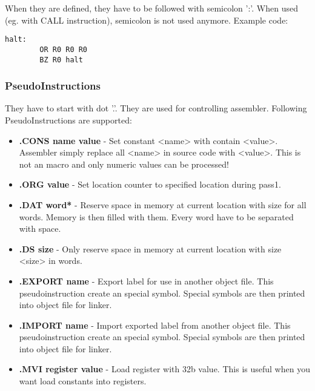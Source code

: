 When they are defined, they have to be followed with semicolon ':'. When used
(eg. with CALL instruction), semicolon is not used anymore. Example code:

\begin{lstlisting}[language={[x86masm]Assembler}, frame=single]
    halt:
        OR R0 R0 R0
        BZ R0 halt
\end{lstlisting}

\subsubsection{PseudoInstructions}

They have to start with dot '.'. They are used for controlling assembler. Following
PseudoInstructions are supported:

\begin{itemize}
    \item \textbf{.CONS name value} -
    Set constant <name> with contain <value>. Assembler simply replace all
    <name> in source code with <value>. This is not an macro and only numeric
    values can be processed!

    \item \textbf{.ORG value} -
    Set location counter to specified location during pass1.

    \item \textbf{.DAT word*} -
    Reserve space in memory at current location with size for all words.
    Memory is then filled with them. Every word have to be separated with
    space.

    \item \textbf{.DS size} -
    Only reserve space in memory at current location with size <size> in words.

    \item \textbf{.EXPORT name} -
    Export label for use in another object file. This pseudoinstruction create
    an special symbol. Special symbols are then printed into object file for
    linker.

    \item \textbf{.IMPORT name} -
    Import exported label from another object file. This pseudoinstruction
    create an special symbol. Special symbols are then printed into object file
    for linker.

    \item \textbf{.MVI register value} -
    Load register with 32b value. This is useful when you want load constants
    into registers.
\end{itemize}
